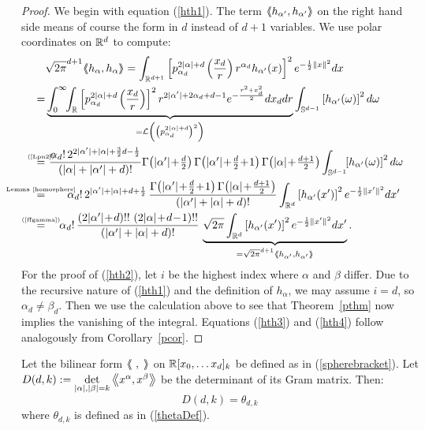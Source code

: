 \begin{proof}
We begin with equation (\ref{hth1}). The term $\left<\!\!\!\:\left< h_{\alpha '},h_{\alpha '}\right>\!\!\!\:\right>$ on the right hand side means of course the form in $d$ instead of $d\!+\!1$ variables. We use polar coordinates on $\mathbb{R}^d$ to compute:
\begin{align*}
 & \sqrt{2\pi}^{d+1}\!\bra h_\alpha ,h_\alpha \ket = \int_{\R^{d+1}}\left[\pol{\alpha_d}{2|\alpha|+d}\left(\frac{x_d}{r}\right) r^{\alpha_d}h_{\alpha'}(x)\right]^2 e^{-\frac{1}{2}\|x\|^2} dx \\
 = & \underbrace{ \int_0^\infty\!\!\int_{\R} \left[\pol{\alpha_d}{2|\alpha|+d}\left(\frac{x_d}{r}\right)\right]^2 r^{2|\alpha'|+2\alpha_d+d-1} e^{-\frac{r^2+x_d^2}{2} }dx_ddr}_{= \L\left(\left(\pol{\alpha_d}{2|\alpha|+d}\right)^2\right)}
 \int_{\S^{d-1}}\left[h_{\alpha'}(\omega)\right]^2 d\omega \\
\myeq{(\ref{Lpn2})}& \  \frac{\alpha_d!\, 2^{2|\alpha '|+|\alpha|+\frac{3}{2}d-\frac{1}{2}} }{\left(|\alpha|+|\alpha'|+d\right)!} { \textstyle
\Gamma\!\left( |\alpha'| \!+\!\frac{d}{2}\right)\Gamma\!\left( |\alpha'|\!+\! \frac{d}{2}\!+\! 1\right) \Gamma\!\left( |\alpha| \!+\! \frac{d+1}{2}\right) }\int_{\S^{d-1}}\!\!\left[h_{\alpha'}(\omega)\right]^2 d\omega \\
\myeq{Lemma~\ref{homosphere}}&\quad\quad \alpha_d!\,2^{|\alpha '|+|\alpha |+d+\frac{1}{2}}\,
\frac{\Gamma\!\left(|\alpha '|\!+\!\frac{d}{2}\!+\!1\right)\Gamma\!\left(|\alpha |\!+\!\tfrac{d+1}{2}\right)}{\left(|\alpha '|+|\alpha |+d\right)!} \int_{\R^d} \left[h_{\alpha'}(x')\right]^2 e^{-\frac{1}{2}\|x'\|^2} dx' \\
\myeq{(\ref{ffgamma})}& \quad\; 
\alpha_d!\,\frac{\left(2|\alpha '|\!+\!d\right)!!\,\left(2|\alpha |\!+\!d\!-\!1\right)!!}{\left(|\alpha '|+|\alpha |+d\right)!}\, \underbrace{\sqrt{2\pi}\int_{\R^d} \left[h_{\alpha'}(x')\right]^2 e^{-\frac{1}{2}\|x'\|^2}  dx'}_{=\sqrt{2\pi}^{d+1}\bra h_{\alpha '},h_{\alpha '}\ket} .
\end{align*}
For the proof of (\ref{hth2}), let $i$ be the highest index where $\alpha$ and $\beta$ differ. Due to the recursive nature of (\ref{hth1}) and the definition of $h_\alpha$, we may assume $i=d$, so $\alpha_d \neq \beta_d$. Then we use the calculation above to see that Theorem~\ref{pthm} now implies the vanishing of the integral. Equations (\ref{hth3}) and (\ref{hth4}) follow analogously from Corollary~\ref{pcor}.
\end{proof}
\begin{theorem}\label{thetaCor} Let the bilinear form $\left<\!\!\!\:\left<\ ,\;\right>\!\!\!\:\right>$ on $\mathbb{R}[x_0,\ldots x_d]_k$ be defined as in (\ref{spherebracket}). Let $D(d,k):=\det\limits_{|\alpha|,|\beta|=k}\left<\!\!\!\:\left< x^\alpha ,x^\beta \right>\!\!\!\:\right> $ be the determinant of its Gram matrix. Then:
$$
D(d,k) = \theta_{d,k}
$$
where $\theta_{d,k}$ is defined as in (\ref{thetaDef}).
\end{theorem}

